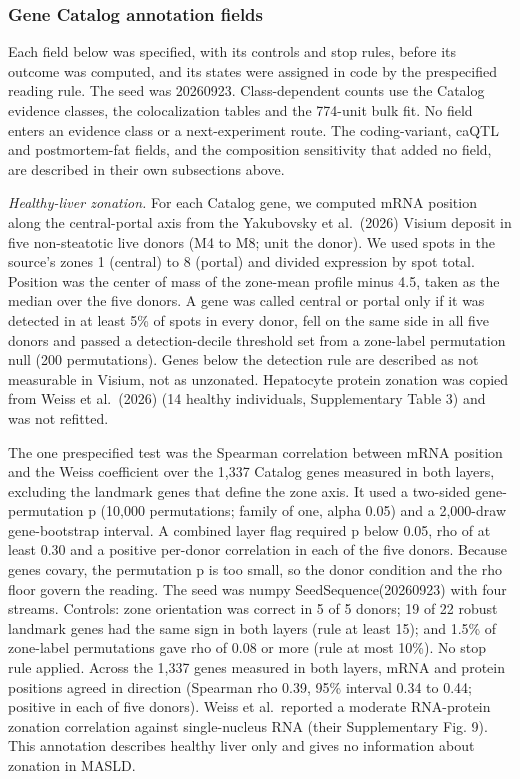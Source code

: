 \subsubsection{Gene Catalog annotation fields}\label{gene-catalog-annotation-fields}

Each field below was specified, with its controls and stop rules, before its outcome was computed, and its states were assigned in code by the prespecified reading rule. The seed was 20260923. Class-dependent counts use the Catalog evidence classes, the colocalization tables and the 774-unit bulk fit. No field enters an evidence class or a next-experiment route. The coding-variant, caQTL and postmortem-fat fields, and the composition sensitivity that added no field, are described in their own subsections above.

\emph{Healthy-liver zonation.} For each Catalog gene, we computed mRNA position along the central-portal axis from the Yakubovsky et al.~(2026) Visium deposit in five non-steatotic live donors (M4 to M8; unit the donor). We used spots in the source's zones 1 (central) to 8 (portal) and divided expression by spot total. Position was the center of mass of the zone-mean profile minus 4.5, taken as the median over the five donors. A gene was called central or portal only if it was detected in at least 5\% of spots in every donor, fell on the same side in all five donors and passed a detection-decile threshold set from a zone-label permutation null (200 permutations). Genes below the detection rule are described as not measurable in Visium, not as unzonated. Hepatocyte protein zonation was copied from Weiss et al.~(2026) (14 healthy individuals, Supplementary Table 3) and was not refitted.

The one prespecified test was the Spearman correlation between mRNA position and the Weiss coefficient over the 1,337 Catalog genes measured in both layers, excluding the landmark genes that define the zone axis. It used a two-sided gene-permutation p (10,000 permutations; family of one, alpha 0.05) and a 2,000-draw gene-bootstrap interval. A combined layer flag required p below 0.05, rho of at least 0.30 and a positive per-donor correlation in each of the five donors. Because genes covary, the permutation p is too small, so the donor condition and the rho floor govern the reading. The seed was numpy SeedSequence(20260923) with four streams. Controls: zone orientation was correct in 5 of 5 donors; 19 of 22 robust landmark genes had the same sign in both layers (rule at least 15); and 1.5\% of zone-label permutations gave \textbar rho\textbar{} of 0.08 or more (rule at most 10\%). No stop rule applied. Across the 1,337 genes measured in both layers, mRNA and protein positions agreed in direction (Spearman rho 0.39, 95\% interval 0.34 to 0.44; positive in each of five donors). Weiss et al.~reported a moderate RNA-protein zonation correlation against single-nucleus RNA (their Supplementary Fig. 9). This annotation describes healthy liver only and gives no information about zonation in MASLD.


